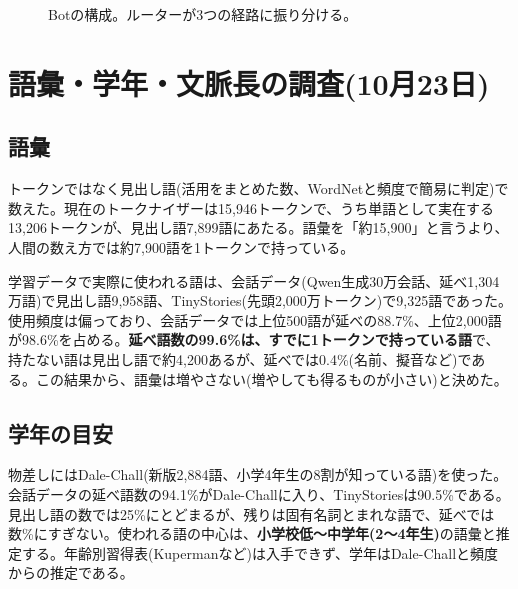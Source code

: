 \documentclass[a4paper,11pt]{article}
\begin{document}
\begin{figure}[H]
\centering
{}
\caption{Botの構成。ルーターが3つの経路に振り分ける。}\label{fig:arch}
\end{figure}

\section{語彙・学年・文脈長の調査(10月23日)}
\subsection{語彙}
トークンではなく見出し語(活用をまとめた数、WordNetと頻度で簡易に判定)で数えた。現在のトークナイザーは15,946トークンで、うち単語として実在する13,206トークンが、見出し語7,899語にあたる。語彙を「約15,900」と言うより、人間の数え方では約7,900語を1トークンで持っている。

学習データで実際に使われる語は、会話データ(Qwen生成30万会話、延べ1,304万語)で見出し語9,958語、TinyStories(先頭2,000万トークン)で9,325語であった。使用頻度は偏っており、会話データでは上位500語が延べの88.7\%、上位2,000語が98.6\%を占める。\textbf{延べ語数の99.6\%は、すでに1トークンで持っている語}で、持たない語は見出し語で約4,200あるが、延べでは0.4\%(名前、擬音など)である。この結果から、語彙は増やさない(増やしても得るものが小さい)と決めた。

\subsection{学年の目安}
物差しにはDale-Chall(新版2,884語、小学4年生の8割が知っている語)\cite{dalechall}を使った。会話データの延べ語数の94.1\%がDale-Challに入り、TinyStoriesは90.5\%である。見出し語の数では25\%にとどまるが、残りは固有名詞とまれな語で、延べでは数\%にすぎない。使われる語の中心は、\textbf{小学校低〜中学年(2〜4年生)}の語彙と推定する。年齢別習得表(Kupermanなど)は入手できず、学年はDale-Challと頻度からの推定である。
\end{document}
